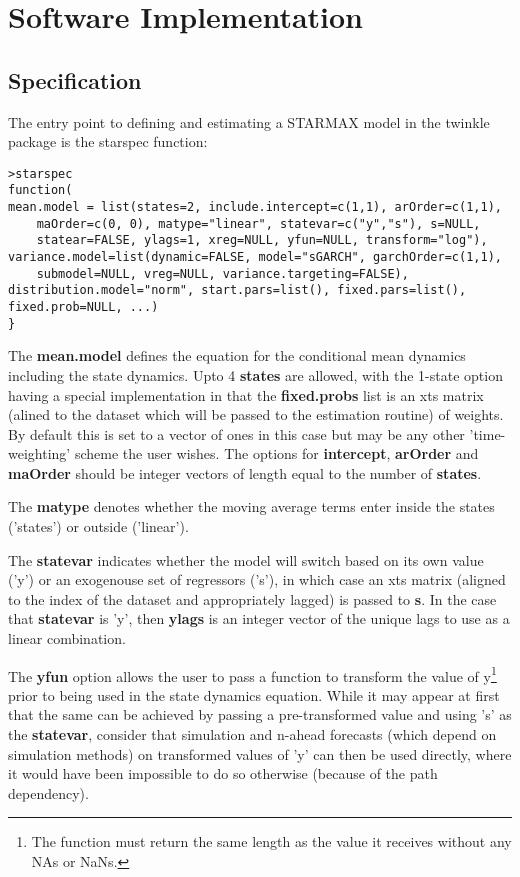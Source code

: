 \pagebreak
\section{Software Implementation}\label{sec:5}
\subsection{Specification}
The entry point to defining and estimating a STARMAX model in the twinkle
package is the starspec function:
\begin{lstlisting}
>starspec
function(
mean.model = list(states=2, include.intercept=c(1,1), arOrder=c(1,1), 
	maOrder=c(0, 0), matype="linear", statevar=c("y","s"), s=NULL, 
	statear=FALSE, ylags=1, xreg=NULL, yfun=NULL, transform="log"), 
variance.model=list(dynamic=FALSE, model="sGARCH", garchOrder=c(1,1), 
	submodel=NULL, vreg=NULL, variance.targeting=FALSE), 
distribution.model="norm", start.pars=list(), fixed.pars=list(), 
fixed.prob=NULL, ...)
}
\end{lstlisting}
The \textbf{mean.model} defines the equation for the conditional mean dynamics
including the state dynamics. Upto 4 \textbf{states} are allowed, with the
1-state option having a special implementation in that the \textbf{fixed.probs}
list is an xts matrix (alined to the dataset which will be passed to the
estimation routine) of weights. By default this is set to a vector of ones in
this case but may be any other 'time-weighting' scheme the user wishes. The
options for \textbf{intercept}, \textbf{arOrder} and \textbf{maOrder} should be
integer vectors of length equal to the number of \textbf{states}. 

The \textbf{matype} denotes whether the moving average terms enter inside the
states ('states') or outside ('linear'). 

The \textbf{statevar} indicates whether the model will switch based on its own
value ('y') or an exogenouse set of regressors ('s'), in which case an xts 
matrix (aligned to the index of the dataset and appropriately lagged) is passed 
to \textbf{s}. In the case that \textbf{statevar} is 'y', then \textbf{ylags} 
is an integer vector of the unique lags to use as a linear combination. 

The \textbf{yfun}  option allows the user to pass a function to transform the 
value of y\footnote{The function must return the same length as the value  it
receives without any NAs or NaNs.} prior to being used in the state dynamics 
equation. While it may appear at first that the same can be achieved by passing 
a pre-transformed value and using 's' as the \textbf{statevar}, consider that
simulation and n-ahead forecasts (which depend on simulation methods) on 
transformed values of 'y' can then be used directly, where it would have been
impossible to do so otherwise (because of the path dependency). 

